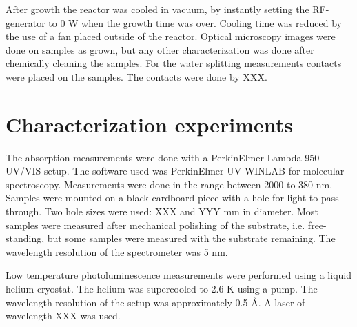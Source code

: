 After growth the reactor was cooled in vacuum, by instantly setting the RF-generator to 0 W when the growth time was over. Cooling time was reduced by the use of a fan placed outside of the reactor. Optical microscopy images were done on samples as grown, but any other characterization was done after chemically cleaning the samples. For the water splitting measurements contacts were placed on the samples. The contacts were done by XXX. 


\section{Characterization experiments}
\label{sec:experimental:characterization}
The absorption measurements were done with a PerkinElmer Lambda 950 UV/VIS setup. The software used was PerkinElmer UV WINLAB for molecular spectroscopy. Measurements were done in the range between 2000 to 380 nm. Samples were mounted on a black cardboard piece with a hole for light to pass through. Two hole sizes were used: XXX and YYY mm in diameter. Most samples were measured after mechanical polishing of the substrate, i.e. free-standing, but some samples were measured with the substrate remaining. The wavelength resolution of the spectrometer was 5 nm. 

Low temperature photoluminescence measurements were performed using a liquid helium cryostat. The helium was supercooled to 2.6 K using a pump. The wavelength resolution of the setup was approximately 0.5 Å. A laser of wavelength XXX was used. 








































